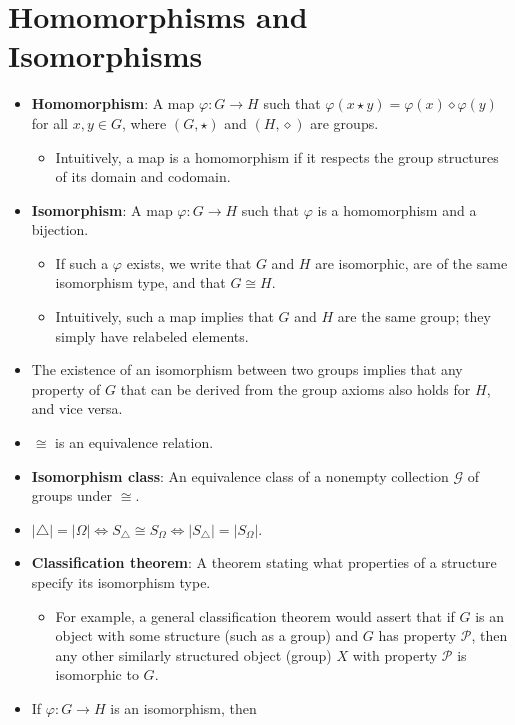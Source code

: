 \documentclass[../notes.tex]{subfiles}
\begin{document}
\section{Homomorphisms and Isomorphisms}
\begin{itemize}
    \item \textbf{Homomorphism}: A map $\varphi:G\to H$ such that $\varphi(x\star y)=\varphi(x)\diamond\varphi(y)$ for all $x,y\in G$, where $(G,\star)$ and $(H,\diamond)$ are groups.
    \begin{itemize}
        \item Intuitively, a map is a homomorphism if it respects the group structures of its domain and codomain.
    \end{itemize}
    \item \textbf{Isomorphism}: A map $\varphi:G\to H$ such that $\varphi$ is a homomorphism and a bijection.
    \begin{itemize}
        \item If such a $\varphi$ exists, we write that $G$ and $H$ are isomorphic, are of the same isomorphism type, and that $G\cong H$.
        \item Intuitively, such a map implies that $G$ and $H$ are the same group; they simply have relabeled elements.
    \end{itemize}
    \item The existence of an isomorphism between two groups implies that any property of $G$ that can be derived from the group axioms also holds for $H$, and vice versa.
    \item $\cong$ is an equivalence relation.
    \item \textbf{Isomorphism class}: An equivalence class of a nonempty collection $\mathcal{G}$ of groups under $\cong$.
    \item $|\triangle|=|\Omega|\Longleftrightarrow S_\triangle\cong S_\Omega\Longleftrightarrow|S_\triangle|=|S_\Omega|$.
    \item \textbf{Classification theorem}: A theorem stating what properties of a structure specify its isomorphism type.
    \begin{itemize}
        \item For example, a general classification theorem would assert that if $G$ is an object with some structure (such as a group) and $G$ has property $\mathcal{P}$, then any other similarly structured object (group) $X$ with property $\mathcal{P}$ is isomorphic to $G$.
    \end{itemize}
    \item If $\varphi:G\to H$ is an isomorphism, then

\end{itemize}
\end{document}
